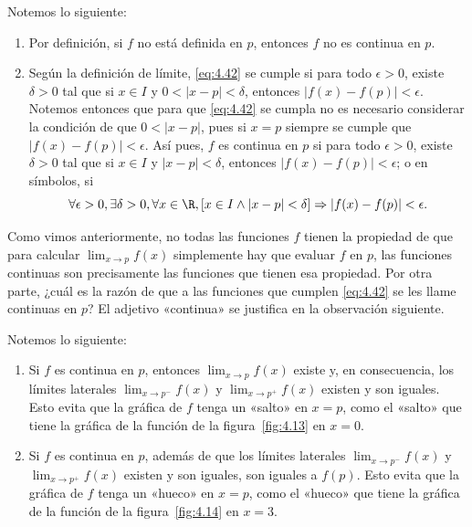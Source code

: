 \documentclass[12pt,a4paper]{book}
\begin{document}
    \begin{observacion}\label{obs:18}
        Notemos lo siguiente:
        \begin{enumerate}[label=\arabic*.,nosep]
            \item Por definición, si $f$ no está definida en $p$, entonces $f$ no es continua en $p$.
            \item Según la definición de límite, \eqref{eq:4.42} se cumple si para todo $\epsilon>0$, existe
            $\delta>0$ tal que si $x\in I$ y $0<|x-p|<\delta$, entonces $|f(x)-f(p)|<\epsilon$.
            Notemos entonces que para que \eqref{eq:4.42} se cumpla no es necesario considerar
            la condición de que $0<|x-p|$, pues si $x=p$ siempre se cumple que
            $|f(x)-f(p)|<\epsilon$. Así pues, $f$ es continua en $p$ si para todo $\epsilon>0$, existe
            $\delta>0$ tal que si $x\in I$ y $|x-p|<\delta$, entonces $|f(x)-f(p)|<\epsilon$; o en
            símbolos, si
            \begin{equation}\label{eq:4.43}
                \forall\epsilon>0,\exists\delta>0,\forall x\in\R,[x\in I\wedge|x-p|<\delta]\Rightarrow|f(x)-f(p)|<\epsilon.
            \end{equation}
        \end{enumerate}
    \end{observacion}

    Como vimos anteriormente, no todas las funciones $f$ tienen la propiedad
    de que para calcular $\lim_{x\to p}f(x)$ simplemente hay que evaluar $f$ en $p$, las
    funciones continuas son precisamente las funciones que tienen esa propiedad.
    Por otra parte, ¿cuál es la razón de que a las funciones que cumplen \eqref{eq:4.42} se
    les llame continuas en $p$? El adjetivo «continua» se justifica en la observación
    siguiente.

    \begin{observacion}\label{obs:19}
        Notemos lo siguiente:
        \begin{enumerate}[label=\arabic*.,nosep]
            \item Si $f$ es continua en $p$, entonces $\lim_{x\to p}f(x)$ existe y, en consecuencia, los
            límites laterales $\lim_{x\to p^{-}}f(x)$ y $\lim_{x\to p^{+}}f(x)$ existen y son iguales. Esto
            evita que la gráfica de $f$ tenga un «salto» en $x=p$, como el «salto» que
            tiene la gráfica de la función de la figura~\ref{fig:4.13} en $x=0$.
            \item Si $f$ es continua en $p$, además de que los límites laterales $\lim_{x\to p^{-}}f(x)$
            y $\lim_{x\to p^{+}}f(x)$ existen y son iguales, son iguales a $f(p)$. Esto evita que
            la gráfica de $f$ tenga un «hueco» en $x=p$, como el «hueco» que tiene la
            gráfica de la función de la figura~\ref{fig:4.14} en $x=3$.
        \end{enumerate}
    \end{observacion}
\end{document}

